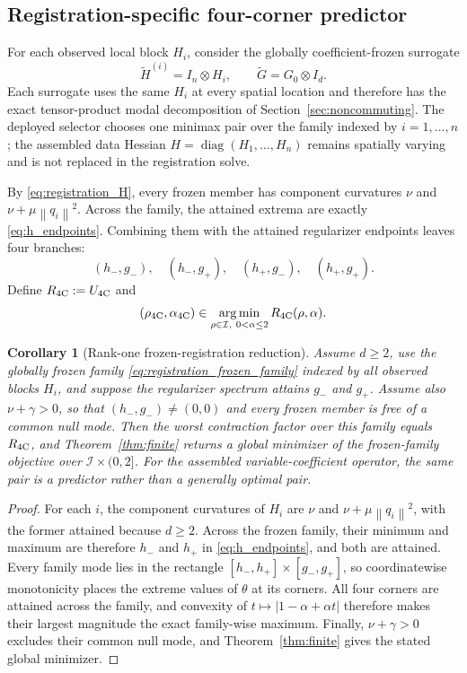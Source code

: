 \documentclass[pdflatex,iicol,sn-mathphys-num]{sn-jnl}
\newtheorem{corollary}[theorem]{Corollary}
\theoremstyle{definition}
\newcommand{\norm}[1]{\left\lVert #1\right\rVert}
\newcommand{\diag}{\operatorname{diag}}
\newcommand{\argmin}{\operatorname*{arg\,min}}
\newcommand{\Ufour}{U_{\mathrm{4C}}}
\begin{document}
\subsection{Registration-specific four-corner predictor}
For each observed local block $H_i$, consider the globally coefficient-frozen
surrogate
\begin{equation}
\widetilde H^{(i)}=I_n\otimes H_i,\qquad
\widetilde G=G_0\otimes I_d.
\label{eq:registration_frozen_family}
\end{equation}
Each surrogate uses the same $H_i$ at every spatial location and therefore has
the exact tensor-product modal decomposition of Section~\ref{sec:noncommuting}.
The deployed selector chooses one minimax pair over the family indexed by
$i=1,\ldots,n$; the assembled data Hessian
$H=\diag(H_1,\ldots,H_n)$ remains spatially varying and is not replaced in the
registration solve.

By \eqref{eq:registration_H}, every frozen member has component curvatures
$\nu$ and $\nu+\mu\norm{q_i}^2$. Across the family, the attained extrema are
exactly \eqref{eq:h_endpoints}. Combining them with the attained regularizer
endpoints leaves four branches:
\[
(h_-,g_-),\quad(h_-,g_+),\quad(h_+,g_-),\quad(h_+,g_+).
\]
Define
$R_{\rm 4C}:=\Ufour$ and
\[
(\rho_{\rm 4C},\alpha_{\rm 4C})
\in\argmin_{\rho\in\mathcal I,\ 0<\alpha\le2}
R_{\rm 4C}(\rho,\alpha).
\]
\begin{corollary}[Rank-one frozen-registration reduction]
\label{cor:registration_fourcorner}
Assume $d\ge2$, use the globally frozen family
\eqref{eq:registration_frozen_family} indexed by all observed blocks $H_i$,
and suppose the regularizer spectrum attains $g_-$ and $g_+$. Assume also
$\nu+\gamma>0$, so that $(h_-,g_-)\ne(0,0)$ and every frozen member is free of
a common null mode. Then the worst contraction factor over this family equals
$R_{\rm 4C}$, and Theorem~\ref{thm:finite} returns a global minimizer of the
frozen-family objective over $\mathcal I\times(0,2]$. For the assembled
variable-coefficient operator, the same pair is a predictor rather than a
generally optimal pair.
\end{corollary}
\begin{proof}
For each $i$, the component curvatures of $H_i$ are $\nu$ and
$\nu+\mu\norm{q_i}^2$, with the former attained because $d\ge2$. Across the
frozen family, their minimum and maximum are therefore $h_-$ and $h_+$ in
\eqref{eq:h_endpoints}, and both are attained. Every family mode lies in the
rectangle $[h_-,h_+]\times[g_-,g_+]$, so coordinatewise monotonicity places
the extreme values of $\theta$ at its corners. All four corners are attained
across the family, and convexity of $t\mapsto|1-\alpha+\alpha t|$ therefore
makes their largest magnitude the exact family-wise maximum. Finally,
$\nu+\gamma>0$ excludes their common null mode, and
Theorem~\ref{thm:finite} gives the stated global minimizer.
\end{proof}
\end{document}
